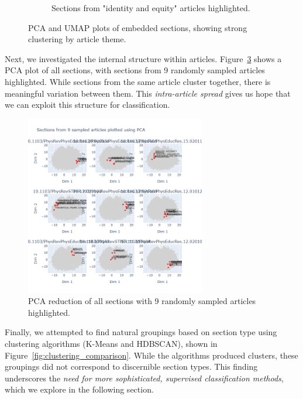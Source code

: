 \begin{figure}
\begin{subfigure}[b]{0.49\textwidth}
        \caption{Sections from "identity and equity" articles highlighted.}
        \label{fig:identity_highlight}
    \end{subfigure}
    \caption{PCA and UMAP plots of embedded sections, showing strong clustering by article theme.}
    \label{fig:pca_umap_sections}
\end{figure}

Next, we investigated the internal structure within articles.
Figure~\ref{fig:sampled_articles} shows a PCA plot of all sections, with
sections from 9 randomly sampled articles highlighted. While sections from the
same article cluster together, there is meaningful variation between them. This
\emph{intra-article spread} gives us hope that we can exploit this structure for
classification.

\begin{figure}
    \centering
    \includegraphics[width=0.7\textwidth]{media/article_sections_structure.png}
    \caption{PCA reduction of all sections with 9 randomly sampled articles highlighted.}
    \label{fig:sampled_articles}
\end{figure}

Finally, we attempted to find natural groupings based on section type using
clustering algorithms (K-Means and HDBSCAN), shown in
Figure~\ref{fig:clustering_comparison}. While the algorithms produced clusters,
these groupings did not correspond to discernible section types. This finding
underscores the \emph{need for more sophisticated, supervised classification
methods}, which we explore in the following section.

